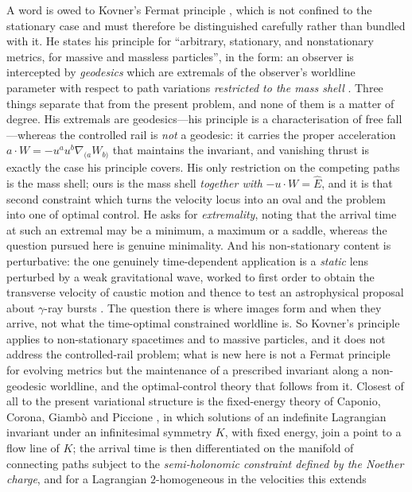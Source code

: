 \documentclass[12pt]{iopart}
\theoremstyle{plain}
\theoremstyle{definition}
\theoremstyle{remark}
\newcommand{\Ehat}{\hat E}
\begin{document}
A word is owed to Kovner's Fermat principle \cite{Kovner1990}, which is not confined
to the stationary case and must therefore be distinguished carefully rather than
bundled with it. He states his principle for ``arbitrary, stationary, and
nonstationary metrics, for massive and massless particles'', in the form: an
observer is intercepted by \emph{geodesics} which are extremals of the observer's
worldline parameter with respect to path variations \emph{restricted to the mass
shell} \cite[Eq.~(2.14)]{Kovner1990}. Three things separate that from the present
problem, and none of them is a matter of degree. His extremals are geodesics---his
principle is a characterisation of free fall---whereas the controlled rail is
\emph{not} a geodesic: it carries the proper acceleration
$a\cdot W=-u^au^b\nabla_{(a}W_{b)}$ that maintains the invariant, and vanishing
thrust is exactly the case his principle covers. His only restriction on the
competing paths is the mass shell; ours is the mass shell \emph{together with}
$-u\cdot W=\Ehat$, and it is that second constraint which turns the velocity locus
into an oval and the problem into one of optimal control. He asks for
\emph{extremality}, noting that the arrival time at such an extremal may be a
minimum, a maximum or a saddle, whereas the question pursued here is genuine
minimality. And his non-stationary content is perturbative: the one genuinely
time-dependent application is a \emph{static} lens perturbed by a weak
gravitational wave, worked to first order to obtain the transverse velocity of
caustic motion and thence to test an astrophysical proposal about $\gamma$-ray
bursts \cite[\S\S IV--V]{Kovner1990}. The question there is where images form and
when they arrive, not what the time-optimal constrained worldline is. So Kovner's principle applies to non-stationary spacetimes and to
massive particles, and it does not address the controlled-rail problem; what is new
here is not a Fermat principle for evolving metrics but the maintenance of a
prescribed invariant along a non-geodesic worldline, and the optimal-control theory
that follows from it. Closest of
all to the present variational structure is the fixed-energy theory of Caponio, Corona,
Giamb\`o and Piccione \cite{CaponioCoronaGiamboPiccione2024}, in which solutions of an
indefinite Lagrangian invariant under an infinitesimal symmetry $K$, with fixed energy,
join a point to a flow line of $K$; the arrival time is then differentiated on the
manifold of connecting paths subject to the \emph{semi-holonomic constraint defined by
the Noether charge}, and for a Lagrangian $2$-homogeneous in the velocities this extends
\end{document}
